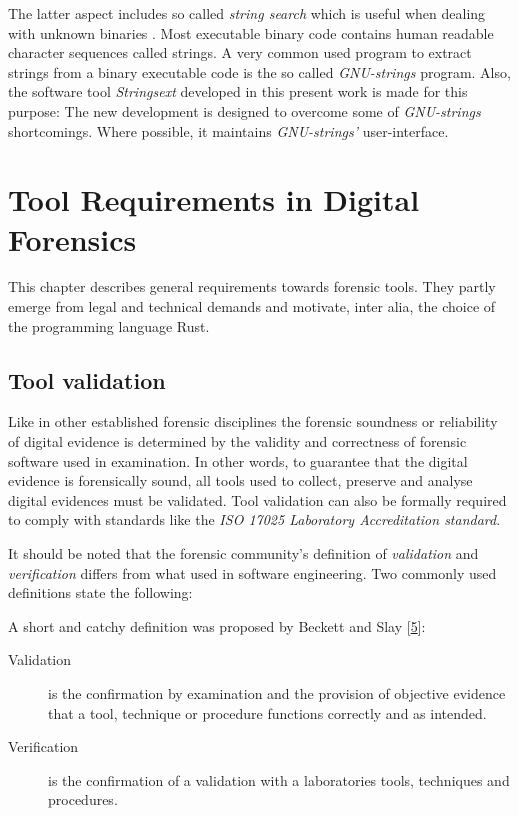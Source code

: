 The latter aspect includes so called \emph{string search} which is
useful when dealing with unknown binaries . Most executable binary code
contains human readable character sequences called strings. A very
common used program to extract strings from a binary executable code is
the so called \emph{GNU-strings} program. Also, the software tool
\emph{Stringsext} developed in this present work is made for this
purpose: The new development is designed to overcome some of
\emph{GNU-strings} shortcomings. Where possible, it maintains
\emph{GNU-strings'} user-interface.

\hypertarget{_tool_requirements_in_digital_forensics}{\section{Tool
Requirements in Digital
Forensics}\label{_tool_requirements_in_digital_forensics}}

This chapter describes general requirements towards forensic tools. They
partly emerge from legal and technical demands and motivate, inter alia,
the choice of the programming language Rust.

\hypertarget{_tool_validation}{\subsection{Tool
validation}\label{_tool_validation}}

Like in other established forensic disciplines the forensic soundness or
reliability of digital evidence is determined by the validity and
correctness of forensic software used in examination. In other words, to
guarantee that the digital evidence is forensically sound, all tools
used to collect, preserve and analyse digital evidences must be
validated. Tool validation can also be formally required to comply with
standards like the \emph{ISO 17025 Laboratory Accreditation standard}.

It should be noted that the forensic community's definition of
\emph{validation} and \emph{verification} differs from what used in
software engineering. Two commonly used definitions state the following:

A short and catchy definition was proposed by Beckett and Slay
{[}\protect\hyperlink{beckett2007}{5}{]}:

\begin{description}
\item[Validation]
is the confirmation by examination and the provision of objective
evidence that a tool, technique or procedure functions correctly and as
intended.
\item[Verification]
is the confirmation of a validation with a laboratories tools,
techniques and procedures.
\end{description}

